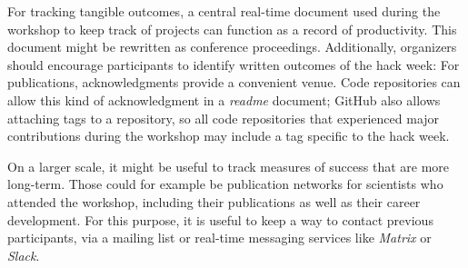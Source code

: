 \documentclass{aastex62}
\begin{document}
For tracking tangible outcomes, a central real-time document used during the workshop to keep track of projects can function as a record of productivity. This document might be rewritten as conference proceedings. Additionally, organizers should encourage participants to identify written outcomes of the hack week: For publications, acknowledgments provide a convenient venue. Code repositories can allow this kind of acknowledgment in a \textit{readme} document; GitHub also allows attaching tags to a repository, so all code repositories that experienced major contributions during the workshop may include a tag specific to the hack week.

On a larger scale, it might be useful to track measures of success that are more long-term. Those could for example be publication networks for scientists who attended the workshop, including their publications as well as their career development. For this purpose, it is useful to keep a way to contact previous participants, via a mailing list or real-time messaging services like \textit{Matrix} or \textit{Slack}.



\end{document}
